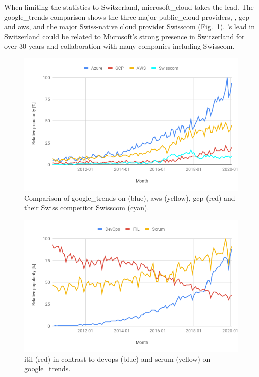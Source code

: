 \documentclass[../main.tex]{subfiles}
\begin{document}
    When limiting the statistics to Switzerland, \gls{microsoft_cloud} takes the lead.
    The \gls{google_trends} comparison shows the three major \gls{public_cloud} providers, , \acrshort{gcp} and \acrshort{aws}, and the major Swiss-native \gls{cloud} provider Swisscom (Fig.~\ref{fig:cloudtrend_swiss}).
    's lead in Switzerland could be related to Microsoft's strong presence in Switzerland for over 30 years and collaboration with many companies including Swisscom.\cite{microsoft_exand_swiss}

    \begin{figure}[h]
        \centering
        \includegraphics[width=.8\linewidth]{img/intro_cloud_trend_swiss.png}
        \captionsetup{justification=centering}
        \caption{
        Comparison of \gls{google_trends} on  (blue), \acrshort{aws} (yellow), \acrshort{gcp} (red) and their Swiss competitor Swisscom (cyan).\cite{cloudtrend_swiss}
        }
        \label{fig:cloudtrend_swiss}
    \end{figure}

    \begin{figure}[h]
        \centering
        \includegraphics[width=.8\linewidth]{img/intro_devops_trend.png}
        \captionsetup{justification=centering}
        \caption{
        \gls{itil} (red) in contrast to \gls{devops} (blue) and \Gls{scrum} (yellow) on \gls{google_trends}.\cite{devopstrend}
        }
        \label{fig:devops_trend}
    \end{figure}
\end{document}
